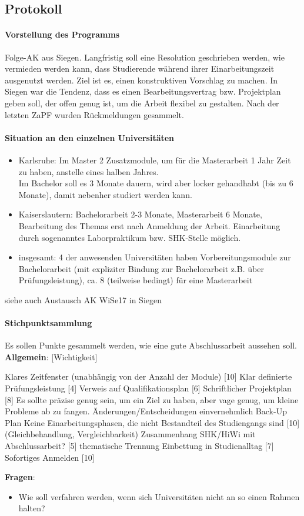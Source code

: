   \subsection*{Protokoll}
    \paragraph{Vorstellung des Programms}
      Folge-AK aus Siegen. Langfristig soll eine Resolution geschrieben werden, wie vermieden werden kann, dass Studierende während ihrer Einarbeitungszeit ausgenutzt werden. Ziel ist es, einen konstruktiven Vorschlag zu machen. In Siegen war die Tendenz,
      dass es einen Bearbeitungsvertrag bzw. Projektplan geben soll, der offen genug ist, um die Arbeit flexibel zu gestalten.
      Nach der letzten ZaPF wurden Rückmeldungen gesammelt.

    \paragraph{Situation an den einzelnen Universitäten}
      \begin{itemize}
        \item Karlsruhe: Im Master 2 Zusatzmodule, um für die Masterarbeit 1 Jahr Zeit zu haben, anstelle eines halben Jahres.\\ Im Bachelor soll es 3 Monate dauern, wird aber locker gehandhabt (bis zu 6 Monate), damit nebenher studiert werden kann.
        \item Kaiserslautern: Bachelorarbeit 2-3 Monate, Masterarbeit 6 Monate, Bearbeitung des Themas erst nach Anmeldung der Arbeit. Einarbeitung durch sogenanntes Laborpraktikum bzw. SHK-Stelle möglich.
        \item insgesamt: 4 der anwesenden Universitäten haben Vorbereitungsmodule zur Bachelorarbeit (mit expliziter Bindung zur Bachelorarbeit z.B. über Prüfungsleistung), ca. 8 (teilweise bedingt) für eine Masterarbeit
      \end{itemize}
      siehe auch Austausch AK WiSe17 in Siegen

    \paragraph{Stichpunktsammlung}
      Es sollen Punkte gesammelt werden, wie eine gute Abschlussarbeit aussehen soll. \\

      \textbf{Allgemein}: [Wichtigkeit]
      \begin{outline}
        \1 Klares Zeitfenster (unabhängig von der Anzahl der Module) [10]
        \1 Klar definierte Prüfungsleistung [4]
        \1 Verweis auf Qualifikationsplan [6]
        \1 Schriftlicher Projektplan [8]
        \1 Es sollte präzise genug sein, um ein Ziel zu haben, aber vage genug, um kleine Probleme ab zu fangen.
        \1 Änderungen/Entscheidungen einvernehmlich
        \1 Back-Up Plan
        \1 Keine Einarbeitungsphasen, die nicht Bestandteil des Studiengangs sind [10] (Gleichbehandlung, Vergleichbarkeit)
        \1 Zusammenhang SHK/HiWi mit Abschlussarbeit? [5]
          \2 thematische Trennung
        \1 Einbettung in Studienalltag [7]
        \1 Sofortiges Anmelden [10]
      \end{outline}

      \textbf{Fragen}:
      \begin{itemize}
        \item Wie soll verfahren werden, wenn sich Universitäten nicht an so einen Rahmen halten?
      \end{itemize}
